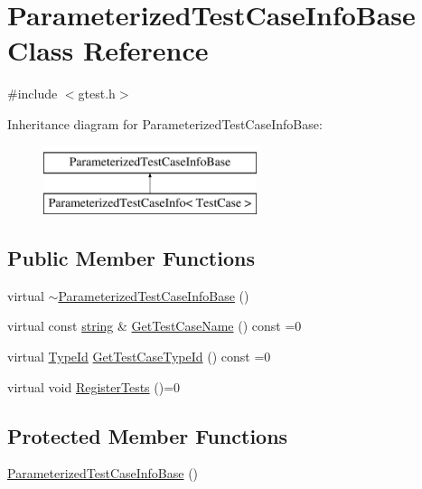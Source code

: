 \hypertarget{classtesting_1_1internal_1_1ParameterizedTestCaseInfoBase}{\section{\-Parameterized\-Test\-Case\-Info\-Base \-Class \-Reference}
\label{d3/df9/classtesting_1_1internal_1_1ParameterizedTestCaseInfoBase}
}


{\ttfamily \#include $<$gtest.\-h$>$}

\-Inheritance diagram for \-Parameterized\-Test\-Case\-Info\-Base\-:\begin{figure}[H]
\begin{center}
\leavevmode
\includegraphics[height=2.000000cm]{d3/df9/classtesting_1_1internal_1_1ParameterizedTestCaseInfoBase}
\end{center}
\end{figure}
\subsection*{\-Public \-Member \-Functions}
\begin{DoxyCompactItemize}
\item 
virtual \hyperlink{classtesting_1_1internal_1_1ParameterizedTestCaseInfoBase_ac1d02745eec9b444774969ba10d080ea}{$\sim$\-Parameterized\-Test\-Case\-Info\-Base} ()
\item 
virtual const \hyperlink{namespacetesting_1_1internal_a9882e571372fc19a02d2b2949e1f1557}{string} \& \hyperlink{classtesting_1_1internal_1_1ParameterizedTestCaseInfoBase_ab462b531b5fb03fcf8912deecab6cd30}{\-Get\-Test\-Case\-Name} () const =0
\item 
virtual \hyperlink{namespacetesting_1_1internal_ac8e91f0c6a06c0361dc3152ddfeb2342}{\-Type\-Id} \hyperlink{classtesting_1_1internal_1_1ParameterizedTestCaseInfoBase_a78b47e80dcec68807fc4bcac02112b08}{\-Get\-Test\-Case\-Type\-Id} () const =0
\item 
virtual void \hyperlink{classtesting_1_1internal_1_1ParameterizedTestCaseInfoBase_aa06b9a3c47449c5236ac22fa111e32d4}{\-Register\-Tests} ()=0
\end{DoxyCompactItemize}
\subsection*{\-Protected \-Member \-Functions}
\begin{DoxyCompactItemize}
\item 
\hyperlink{classtesting_1_1internal_1_1ParameterizedTestCaseInfoBase_a36b35884f4b38f1c538f9ae8ac28e767}{\-Parameterized\-Test\-Case\-Info\-Base} ()
\end{DoxyCompactItemize}
